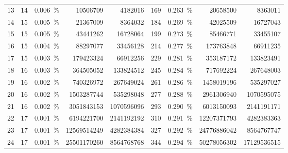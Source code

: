 \begin{tabular}{ r | c c r r | c c r r }
    \rowcolor[gray]{0.925}
    \num{13} & \num{14} & \SI{0.006}{\%} & \num{10506709} & \num{4182016} & \num{169} & \SI{0.263}{\%} & \num{20658500} & \num{8363011} \\
    \num{14} & \num{15} & \SI{0.005}{\%} & \num{21367009} & \num{8364032} & \num{184} & \SI{0.269}{\%} & \num{42025509} & \num{16727043} \\
    \rowcolor[gray]{0.925}
    \num{15} & \num{15} & \SI{0.005}{\%} & \num{43441262} & \num{16728064} & \num{199} & \SI{0.273}{\%} & \num{85466771} & \num{33455107} \\
    \num{16} & \num{15} & \SI{0.004}{\%} & \num{88297077} & \num{33456128} & \num{214} & \SI{0.277}{\%} & \num{173763848} & \num{66911235} \\
    \rowcolor[gray]{0.925}
    \num{17} & \num{15} & \SI{0.003}{\%} & \num{179423324} & \num{66912256} & \num{229} & \SI{0.281}{\%} & \num{353187172} & \num{133823491} \\
    \num{18} & \num{16} & \SI{0.003}{\%} & \num{364505052} & \num{133824512} & \num{245} & \SI{0.284}{\%} & \num{717692224} & \num{267648003} \\
    \rowcolor[gray]{0.925}
    \num{19} & \num{16} & \SI{0.002}{\%} & \num{740326972} & \num{267649024} & \num{261} & \SI{0.286}{\%} & \num{1458019196} & \num{535297027} \\
    \num{20} & \num{16} & \SI{0.002}{\%} & \num{1503287744} & \num{535298048} & \num{277} & \SI{0.288}{\%} & \num{2961306940} & \num{1070595075} \\
    \rowcolor[gray]{0.925}
    \num{21} & \num{16} & \SI{0.002}{\%} & \num{3051843153} & \num{1070596096} & \num{293} & \SI{0.290}{\%} & \num{6013150093} & \num{2141191171} \\
    \num{22} & \num{17} & \SI{0.001}{\%} & \num{6194221700} & \num{2141192192} & \num{310} & \SI{0.291}{\%} & \num{12207371793} & \num{4282383363} \\
    \rowcolor[gray]{0.925}
    \num{23} & \num{17} & \SI{0.001}{\%} & \num{12569514249} & \num{4282384384} & \num{327} & \SI{0.292}{\%} & \num{24776886042} & \num{8564767747} \\
    \num{24} & \num{17} & \SI{0.001}{\%} & \num{25501170260} & \num{8564768768} & \num{344} & \SI{0.294}{\%} & \num{50278056302} & \num{17129536515} \\
    \hline
\end{tabular}
